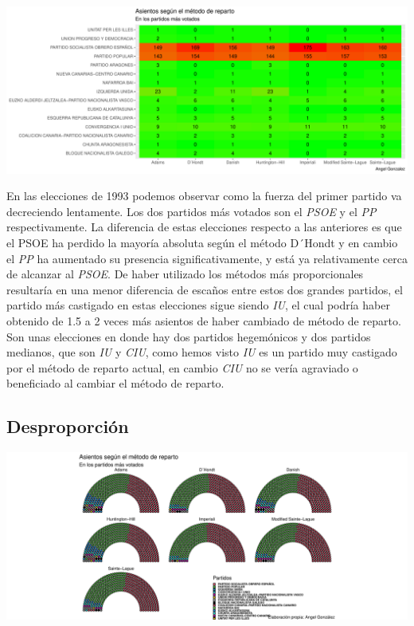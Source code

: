 \documentclass[12pt,a4paper,]{book}
\numberwithin{dummy}{section}
\theoremstyle{ocrenumbox}
\theoremstyle{blacknumex}
\theoremstyle{blacknumbox}
\theoremstyle{ocrenum}
\theoremstyle{ocrenum}
\begin{document}
\begin{center}\includegraphics[width=1\linewidth]{figurasR/unnamed-chunk-91-2} \end{center}

En las elecciones de 1993 podemos observar como la fuerza del primer
partido va decreciendo lentamente. Los dos partidos más votados son el
\emph{PSOE} y el \emph{PP} respectivamente. La diferencia de estas
elecciones respecto a las anteriores es que el PSOE ha perdido la
mayoría absoluta según el método D´Hondt y en cambio el \emph{PP} ha
aumentado su presencia significativamente, y está ya relativamente cerca
de alcanzar al \emph{PSOE}. De haber utilizado los métodos más
proporcionales resultaría en una menor diferencia de escaños entre estos
dos grandes partidos, el partido más castigado en estas elecciones sigue
siendo \emph{IU}, el cual podría haber obtenido de 1.5 a 2 veces más
asientos de haber cambiado de método de reparto. Son unas elecciones en
donde hay dos partidos hegemónicos y dos partidos medianos, que son
\emph{IU} y \emph{CIU}, como hemos visto \emph{IU} es un partido muy
castigado por el método de reparto actual, en cambio \emph{CIU} no se
vería agraviado o beneficiado al cambiar el método de reparto.

\hypertarget{desproporciuxf3n-5}{%
\subsection{Desproporción}\label{desproporciuxf3n-5}}

\begin{center}\includegraphics[width=1\linewidth]{figurasR/unnamed-chunk-92-1} \end{center}
\end{document}
